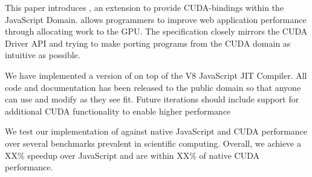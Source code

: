 
This paper introduces \namens, an extension to provide CUDA-bindings
within the JavaScript Domain. \name allows programmers to improve web
application performance through allocating work to the GPU. The specification
closely mirrors the CUDA Driver API and trying to make porting programs from the
CUDA domain as intuitive as possible.

We have implemented a version of \name on top of the V8 JavaScript JIT Compiler. 
All code and documentation has been released to the public domain so that anyone
can use and modify \name as they see fit. Future iterations should include
support for additional CUDA functionality to enable higher performance

We test our implementation of \name against native JavaScript and CUDA
performance over several benchmarks prevalent in scientific computing. Overall,
we achieve a XX\% speedup over JavaScript and are within XX\% of native CUDA
performance.
